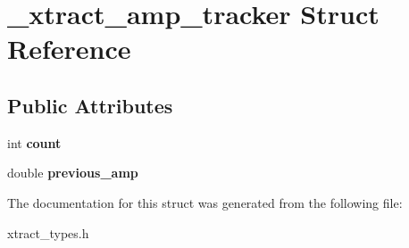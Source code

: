 \hypertarget{struct__xtract__amp__tracker}{\section{\-\_\-xtract\-\_\-amp\-\_\-tracker Struct Reference}
\label{struct__xtract__amp__tracker}
}
\subsection*{Public Attributes}
\begin{DoxyCompactItemize}
\item 
\hypertarget{struct__xtract__amp__tracker_a8fe0fedd005c6fe73ae392c2a70b53e4}{int {\bfseries count}}\label{struct__xtract__amp__tracker_a8fe0fedd005c6fe73ae392c2a70b53e4}

\item 
\hypertarget{struct__xtract__amp__tracker_a0665018cee3066f377c57bd4dee8f96a}{double {\bfseries previous\-\_\-amp}}\label{struct__xtract__amp__tracker_a0665018cee3066f377c57bd4dee8f96a}

\end{DoxyCompactItemize}


The documentation for this struct was generated from the following file\-:\begin{DoxyCompactItemize}
\item 
xtract\-\_\-types.\-h\end{DoxyCompactItemize}
